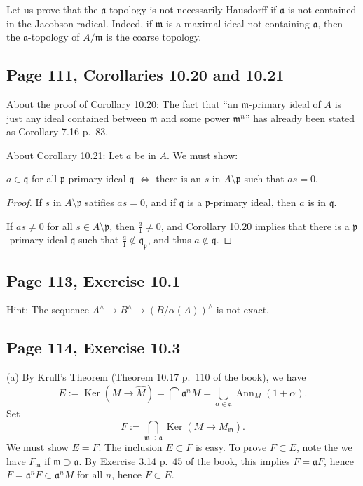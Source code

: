\documentclass[parskip=half,fontsize=12pt]{scrartcl}%
\newcommand{\oo}{\operatorname}\newcommand{\ooo}{\operatorname*}
\newcommand{\mf}{\mathfrak}
\newcommand{\aaa}{\mf a}
\newcommand{\mmm}{\mf m}
\newcommand{\ppp}{\mf p}
\newcommand{\qqq}{\mf q}
\newcommand{\Ker}{\operatorname{Ker}}\newcommand{\Coker}{\operatorname{Coker}}
\begin{document}
Let us prove that the $\aaa$-topology is not necessarily Hausdorff if $\aaa$ is not contained in the Jacobson radical. Indeed, if $\mmm$ is a maximal ideal not containing $\aaa$, then the $\aaa$-topology of $A/\mmm$ is the coarse topology. 

\subsection{Page 111, Corollaries 10.20 and 10.21}%

About the proof of Corollary 10.20: The fact that ``an $\mmm$-primary ideal of $A$ is just any ideal contained between $\mmm$ and some power $\mmm^n$'' has already been stated as Corollary 7.16 p.~83.

About Corollary 10.21: Let $a$ be in $A$. We must show: 

$a\in\qqq$ for all $\ppp$-primary ideal $\qqq$ $\iff$ there is an $s$ in $A\setminus\ppp$ such that $as=0$. 

\begin{proof} 
If $s$ in $A\setminus\ppp$ satifies $as=0$, and if $\qqq$ is a $\ppp$-primary ideal, then $a$ is in $\qqq$.

If $as\neq0$ for all $s\in A\setminus\ppp$, then $\frac a1\neq0$, and Corollary 10.20 implies that there is a $\ppp$-primary ideal $\qqq$ such that $\frac a1\notin\qqq_\ppp$, and thus $a\notin\qqq$. 
\end{proof}

\subsection{Page 113, Exercise 10.1}%

Hint: The sequence $A^\land\to B^\land\to(B/\alpha(A))^\land$ is not exact. 

\subsection{Page 114, Exercise 10.3}%

(a) By Krull's Theorem (Theorem 10.17 p.~110 of the book), we have 
$$
E:=\Ker(M\to\widehat M)=\bigcap\aaa^nM=\bigcup_{\alpha\in\aaa}\oo{Ann}_M(1+\alpha). 
$$ 
Set 
$$
F:=\bigcap_{\mmm\supset\aaa}\Ker(M\to M_\mmm). 
$$ 
We must show $E=F$. The inclusion $E\subset F$ is easy. To prove $F\subset E$, note the we have $F_\mmm$ if $\mmm\supset\aaa$. By Exercise 3.14 p.~45 of the book, this implies $F=\aaa F$, hence $F=\aaa^nF\subset\aaa^nM$ for all $n$, hence $F\subset E$. 
\end{document}
